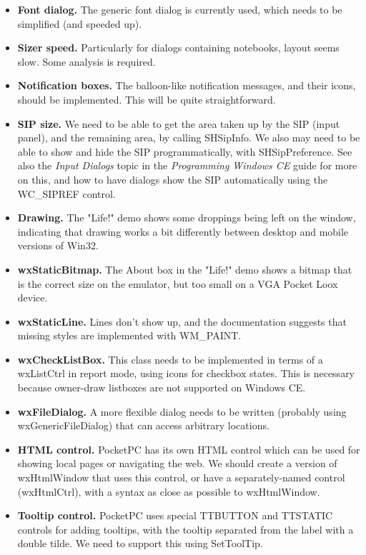 \itemsep=0pt
\begin{itemize}
\item {\bf Font dialog.} The generic font dialog is currently used, which
needs to be simplified (and speeded up).
\item {\bf Sizer speed.} Particularly for dialogs containing notebooks,
layout seems slow. Some analysis is required.
\item {\bf Notification boxes.} The balloon-like notification messages, and their
icons, should be implemented. This will be quite straightforward.
\item {\bf SIP size.} We need to be able to get the area taken up by the SIP (input panel),
and the remaining area, by calling SHSipInfo. We also may need to be able to show and hide
the SIP programmatically, with SHSipPreference. See also the {\it Input Dialogs} topic in
the {\it Programming Windows CE} guide for more on this, and how to have dialogs
show the SIP automatically using the WC\_SIPREF control.
\item {\bf Drawing.} The "Life!" demo shows some droppings being left on the window,
indicating that drawing works a bit differently between desktop and mobile versions of
Win32.
\item {\bf wxStaticBitmap.} The About box in the "Life!" demo shows a bitmap that is
the correct size on the emulator, but too small on a VGA Pocket Loox device.
\item {\bf wxStaticLine.} Lines don't show up, and the documentation suggests that
missing styles are implemented with WM\_PAINT.
\item {\bf wxCheckListBox.} This class needs to be implemented in terms of a wxListCtrl
in report mode, using icons for checkbox states. This is necessary because owner-draw listboxes
are not supported on Windows CE.
\item {\bf wxFileDialog.} A more flexible dialog needs to be written (probably using wxGenericFileDialog)
that can access arbitrary locations.
\item {\bf HTML control.} PocketPC has its own HTML control which can be used for showing
local pages or navigating the web. We should create a version of wxHtmlWindow that uses this
control, or have a separately-named control (wxHtmlCtrl), with a syntax as close as possible to wxHtmlWindow.
\item {\bf Tooltip control.} PocketPC uses special TTBUTTON and TTSTATIC controls for adding
tooltips, with the tooltip separated from the label with a double tilde. We need to support this using SetToolTip.

\end{itemize}
